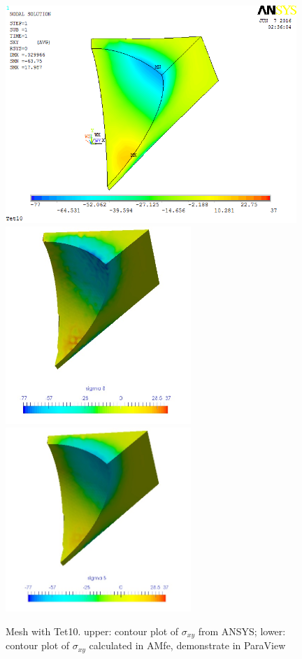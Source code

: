 \begin{figure}[htbp]
	\begin{center}
		\includegraphics[width=11cm,clip]{Tet10_Sxy.png} 	
		\includegraphics[width=7cm,clip]{Tet10_Sxy_PD.png} 		
		\includegraphics[width=7cm,clip]{Tet10_Sxy_P.png} 		
		\caption{Mesh with Tet10. upper: contour plot of $\sigma_{xy}$ from ANSYS; lower: contour plot of $\sigma_{xy}$ calculated in AMfe, demonstrate in ParaView} \label{fig: Tet10_Sxy}
	\end{center}
\end{figure}
\clearpage 

